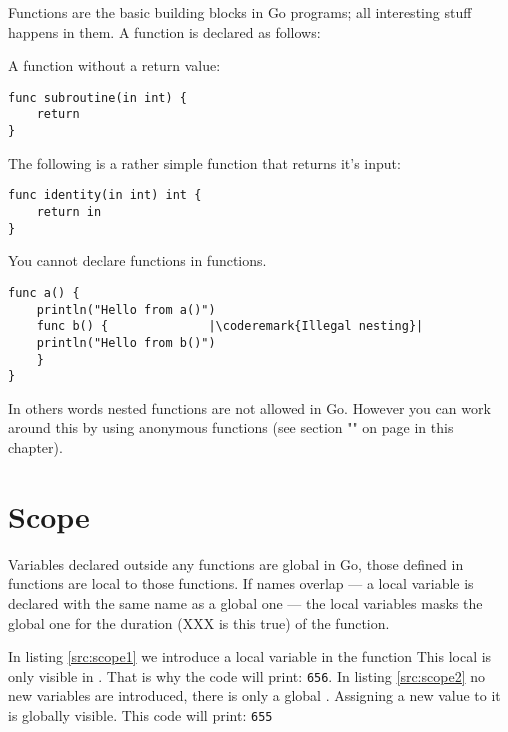 
\noindent{}Functions are the basic building blocks in Go programs; all interesting
stuff happens in them. A function is declared as follows:

\showremarks

A function without a return value:
\begin{lstlisting}
func subroutine(in int) {
    return
}
\end{lstlisting}

The following is a rather simple function that returns it's input:
\begin{lstlisting}
func identity(in int) int {
    return in
}
\end{lstlisting}
You cannot declare functions in functions. 
\begin{lstlisting}
func a() {
    println("Hello from a()")
    func b() {			    |\coderemark{Illegal nesting}|
	println("Hello from b()")    
    }
}
\end{lstlisting}
In others words nested functions are not allowed in Go. However you can 
work around this by using anonymous functions (see section
"" on page \pageref{sec:functions as values} 
in this chapter).

\section{Scope}
Variables declared outside any functions are global in Go, those
defined in functions are local to those functions. If names overlap --- a
local variable is declared with the same name as a global one --- the
local variables masks the global one for the duration (XXX is this true) 
of the function.

\begin{minipage}{.5\textwidth}

\hfill
\vfill
\end{minipage}
\begin{minipage}{.5\textwidth}

\hfill
\vfill
\end{minipage}

In listing \ref{src:scope1} we introduce a local variable 
in the function 
This local  is only visible in . That is
why the code will print: \texttt{656}.
In listing \ref{src:scope2} no new variables are introduced, there
is only a global .
Assigning a new value to it is globally visible. This code will
print: \texttt{655}

